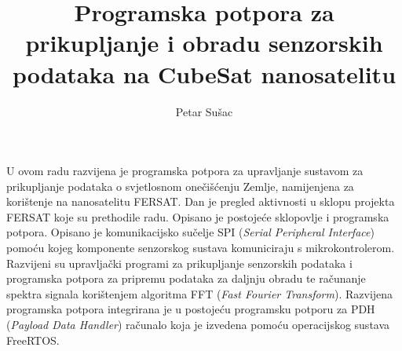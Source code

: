 \documentclass[times, utf8, zavrsni, numeric]{fer}
\begin{document}

\title{Programska potpora za prikupljanje i obradu senzorskih podataka na CubeSat nanosatelitu}

\author{Petar Sušac}


%

\zahvala{}

\tableofcontents











\begin{sazetak}
U ovom radu razvijena je programska potpora za upravljanje sustavom za prikupljanje podataka o svjetlosnom onečišćenju Zemlje, namijenjena za korištenje na nanosatelitu FERSAT. Dan je pregled aktivnosti u sklopu projekta FERSAT koje su prethodile radu. Opisano je postojeće sklopovlje i programska potpora. Opisano je komunikacijsko sučelje SPI (\textit{Serial Peripheral Interface}) pomoću kojeg komponente senzorskog sustava komuniciraju s mikrokontrolerom. Razvijeni su upravljački programi za prikupljanje senzorskih podataka i programska potpora za pripremu podataka za daljnju obradu te računanje spektra signala korištenjem algoritma FFT (\textit{Fast Fourier Transform}). Razvijena programska potpora integrirana je u postojeću programsku potporu za PDH (\textit{Payload Data Handler}) računalo koja je izvedena pomoću operacijskog sustava FreeRTOS.

\end{sazetak}
\end{document}
